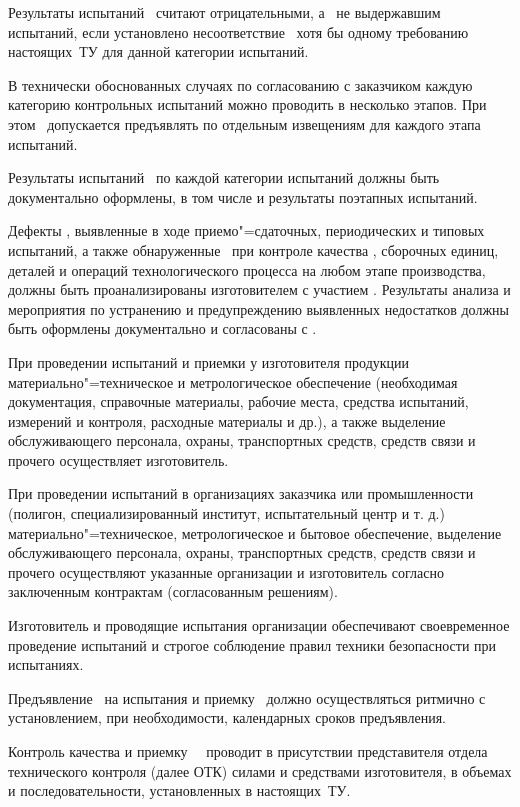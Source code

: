\point
Результаты испытаний \dut \  считают отрицательными, а \dut \ не выдержавшим испытаний, если установлено несоответствие  \dut \ хотя бы одному требованию настоящих~ТУ для данной категории испытаний.

\point 
В технически обоснованных случаях по согласованию с заказчиком каждую категорию контрольных испытаний можно проводить в несколько этапов. При этом \dut \ допускается предъявлять по отдельным извещениям для каждого этапа испытаний.

\point
Результаты испытаний \dut \ по каждой категории испытаний должны быть документально оформлены, в том числе и результаты поэтапных испытаний.

\point
Дефекты \dut, выявленные в ходе приемо"=сдаточных, периодических и типовых испытаний, а также обнаруженные \client \ при контроле качества  \dut, сборочных единиц, деталей и операций технологического процесса на любом этапе производства, должны быть проанализированы изготовителем с участием \client. Результаты анализа и мероприятия по устранению и предупреждению выявленных недостатков должны быть оформлены документально и согласованы с \client.

\point
При проведении испытаний и приемки у изготовителя продукции материально"=техническое и метрологическое обеспечение (необходимая документация, справочные материалы, рабочие места, средства испытаний, измерений и контроля, расходные материалы и др.), а также выделение обслуживающего персонала, охраны, транспортных средств, средств связи и прочего осуществляет изготовитель.

При проведении испытаний в организациях заказчика или промышленности (полигон, специализированный институт, испытательный центр и т. д.) материально"=техническое, метрологическое и бытовое обеспечение, выделение обслуживающего персонала, охраны, транспортных средств, средств связи и прочего осуществляют указанные организации и изготовитель согласно заключенным контрактам (согласованным решениям).

\point
Изготовитель и проводящие испытания организации обеспечивают своевременное проведение испытаний и строгое соблюдение правил техники безопасности при испытаниях.

Предъявление \dut \ на испытания и приемку \client \ должно осуществляться ритмично с установлением, при необходимости, календарных сроков предъявления.

\point
Контроль качества и приемку \dut \ \client \ проводит в присутствии представителя отдела технического контроля (далее ОТК) силами и средствами изготовителя, в объемах и последовательности, установленных в настоящих~ТУ. 

